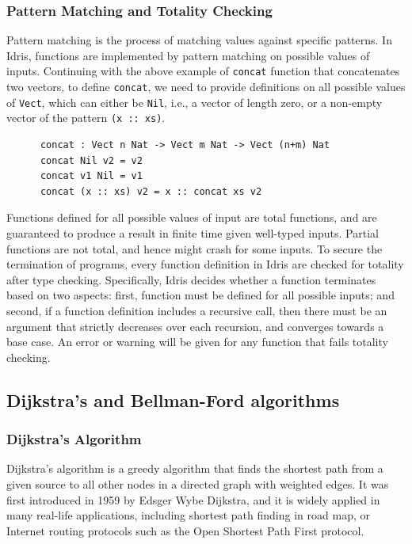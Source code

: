 \documentclass[11pt, a4paper]{article} %
\theoremstyle{definition}
\begin{document}
\subsubsection*{Pattern Matching and Totality Checking}
Pattern matching is the process of matching values against specific patterns. In Idris, functions are implemented by pattern matching on possible values of inputs. Continuing with the above example of \texttt{concat} function that concatenates two vectors, to define \texttt{concat}, we need to provide definitions on all possible values of \texttt{Vect}, which can either be \texttt{Nil}, i.e., a vector of length zero, or a non-empty vector of the pattern \texttt{(x :: xs)}. 
\begin{lstlisting}
      concat : Vect n Nat -> Vect m Nat -> Vect (n+m) Nat
      concat Nil v2 = v2
      concat v1 Nil = v1
      concat (x :: xs) v2 = x :: concat xs v2
\end{lstlisting}

Functions defined for all possible values of input are total functions, and are guaranteed to produce a result in finite time given well-typed inputs. Partial functions are not total, and hence might crash for some inputs. To secure the termination of programs, every function definition in Idris are checked for totality after type checking. Specifically, Idris decides whether a function terminates based on two aspects: first, function must be defined for all possible inputs; and second, if a function definition includes a recursive call, then there must be an argument that strictly decreases over each recursion, and converges towards a base case. An error or warning will be given for any function that fails totality checking. 

\subsection{Dijkstra's and Bellman-Ford algorithms}
\subsubsection*{Dijkstra's Algorithm}
Dijkstra's algorithm is a greedy algorithm that finds the shortest path from a given source to all other nodes in a directed graph with weighted edges. It was first introduced in 1959 by Edsger Wybe Dijkstra, and it is widely applied in many real-life applications, including shortest path finding in road map, or Internet routing protocols such as the Open Shortest Path First protocol. 
\\
\end{document}
